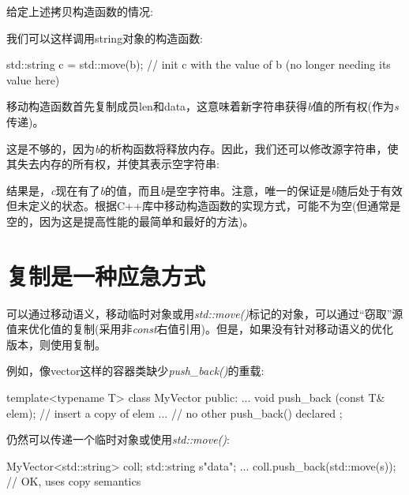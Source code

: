 给定上述拷贝构造函数的情况:\par


我们可以这样调用string对象的构造函数:\par

\begin{codebox}[cpp]
std::string c = std::move(b); // init c with the value of b (no longer needing its value here)
\end{codebox}

移动构造函数首先复制成员len和data，这意味着新字符串获得\textit{b}值的所有权(作为\textit{s}传递)。\par


这是不够的，因为\textit{b}的析构函数将释放内存。因此，我们还可以修改源字符串，使其失去内存的所有权，并使其表示空字符串:\par


结果是，\textit{c}现在有了\textit{b}的值，而且\textit{b}是空字符串。注意，唯一的保证是\textit{b}随后处于有效但未定义的状态。根据C++库中移动构造函数的实现方式，可能不为空(但通常是空的，因为这是提高性能的最简单和最好的方法)。\par


\section{复制是一种应急方式}

可以通过移动语义，移动临时对象或用\textit{std::move()}标记的对象，可以通过“窃取”源值来优化值的复制(采用非\textit{const}右值引用)。但是，如果没有针对移动语义的优化版本，则使用复制。\par

例如，像vector这样的容器类缺少\textit{push\_\allowbreak{}back(\allowbreak{})\allowbreak{}}的重载:\par

\begin{codebox}[cpp]
template<typename T>
class MyVector {
  public:
  ...
  void push_back (const T& elem); // insert a copy of elem
  ... // no other push_back() declared
};
\end{codebox}

仍然可以传递一个临时对象或使用\textit{std::move()}:\par

\begin{codebox}[cpp]
MyVector<std::string> coll;
std::string s{"data"};
...
coll.push_back(std::move(s)); // OK, uses copy semantics
\end{codebox}

